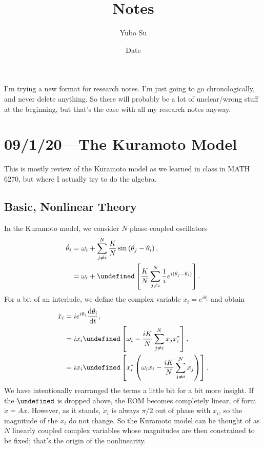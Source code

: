 \documentclass[11pt,
        usenames, %
        dvipsnames %
    ]{article}
\newcommand*{\rd}[2]{\frac{\mathrm{d}#1}{\mathrm{d}#2}}
\newcommand*{\p}[1]{\left(#1\right)}
\newcommand*{\s}[1]{\left[#1\right]}
\let\Re\undefined
\DeclareMathOperator{\Re}{Re}
\begin{document}
\def\Snospace~{\S{}} %
\renewcommand*{\sectionautorefname}{\Snospace}
\renewcommand*{\appendixautorefname}{\Snospace}
\renewcommand*{\figureautorefname}{Fig.}
\renewcommand*{\equationautorefname}{Eq.}
\renewcommand*{\tableautorefname}{Tab.}

\onehalfspacing

\pagestyle{fancy}
\rhead{}
\cfoot{\thepage/\pageref{LastPage}}

\title{Notes}
\author{Yubo Su}
\date{Date}

\maketitle

I'm trying a new format for research notes. I'm just going to go
chronologically, and never delete anything. So there will probably be a lot of
unclear/wrong stuff at the beginning, but that's the case with all my research
notes anyway.

\tableofcontents

\clearpage

\section{09/1/20---The Kuramoto Model} %

This is mostly review of the Kuramoto model as we learned in class in MATH 6270,
but where I actually try to do the algebra.

\subsection{Basic, Nonlinear Theory}

In the Kuramoto model, we consider $N$ phase-coupled oscillators
\begin{align}
    \dot{\theta}_i &= \omega_i + \sum\limits_{j \neq i}^N
            \frac{K}{N}\sin\p{\theta_j - \theta_i},\\
        &= \omega_i + \Re\s{\frac{K}{N}\sum\limits_{j \neq i}^N
            \frac{1}{i}e^{i\p{\theta_j - \theta_i}}}.
\end{align}
For a bit of an interlude, we define the complex variable $x_i = e^{i\theta_i}$
and obtain
\begin{align}
    \dot{x}_i &= ie^{i\theta_i} \rd{\theta_i}{t},\\
        &= ix_i \Re\s{\omega_i - \frac{iK}{N}\sum\limits_{j \neq i}^N
            x_jx_i^*},\\
        &= ix_i \Re\s{x_i^*\p{\omega_i x_i - \frac{iK}{N}
            \sum\limits_{j \neq i}^N x_j}}.
\end{align}
We have intentionally rearranged the terms a little bit for a bit more insight.
If the $\Re$ is dropped above, the EOM becomes completely linear, of form
$\dot{x} = Ax$. However, as it stands, $\dot{x}_i$ is always $\pi/2$ out of
phase with $x_i$, so the magnitude of the $x_i$ do not change. So the Kuramoto
model can be thought of as $N$ linearly coupled complex variables whose
magnitudes are then constrained to be fixed; that's the origin of the
nonlinearity.
\end{document}
